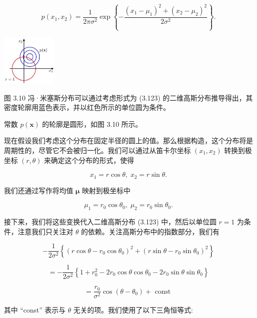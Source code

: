 \documentclass[10pt]{article}
\begin{document}
\[
p\left( {{x}_{1},{x}_{2}}\right)  = \frac{1}{{2\pi }{\sigma }^{2}}\exp \left\{  {-\frac{{\left( {x}_{1} - {\mu }_{1}\right) }^{2} + {\left( {x}_{2} - {\mu }_{2}\right) }^{2}}{2{\sigma }^{2}}}\right\}  . \tag{3.123}
\]

\begin{center}
\includegraphics[max width=0.2\textwidth]{images/0194e279-9b28-703a-88f4-c3ac21e2010d_110_1177_344_365_339_0.jpg}
\end{center}
\hspace*{3em} 

图 3.10 冯·米塞斯分布可以通过考虑形式为 (3.123) 的二维高斯分布推导得出，其密度轮廓用蓝色表示，并以红色所示的单位圆为条件。

常数 \(p\left( \mathbf{x}\right)\) 的轮廓是圆形，如图 3.10 所示。

现在假设我们考虑这个分布在固定半径的圆上的值。那么根据构造，这个分布将是周期性的，尽管它不会被归一化。我们可以通过从笛卡尔坐标 \(\left( {{x}_{1},{x}_{2}}\right)\) 转换到极坐标 \(\left( {r,\theta }\right)\) 来确定这个分布的形式，使得

\[
{x}_{1} = r\cos \theta ,\;{x}_{2} = r\sin \theta . \tag{3.124}
\]

我们还通过写作将均值 \(\mathbf{\mu }\) 映射到极坐标中

\[
{\mu }_{1} = {r}_{0}\cos {\theta }_{0},\;{\mu }_{2} = {r}_{0}\sin {\theta }_{0}. \tag{3.125}
\]

接下来，我们将这些变换代入二维高斯分布 (3.123) 中，然后以单位圆 \(r = 1\) 为条件，注意我们只关注对 \(\theta\) 的依赖。关注高斯分布中的指数部分，我们有

\[
- \frac{1}{2{\sigma }^{2}}\left\{  {{\left( r\cos \theta  - {r}_{0}\cos {\theta }_{0}\right) }^{2} + {\left( r\sin \theta  - {r}_{0}\sin {\theta }_{0}\right) }^{2}}\right\}
\]

\[
=  - \frac{1}{2{\sigma }^{2}}\left\{  {1 + {r}_{0}^{2} - 2{r}_{0}\cos \theta \cos {\theta }_{0} - 2{r}_{0}\sin \theta \sin {\theta }_{0}}\right\}
\]

\[
= \frac{{r}_{0}}{{\sigma }^{2}}\cos \left( {\theta  - {\theta }_{0}}\right)  + \text{ const } \tag{3.126}
\]

其中 “const” 表示与 \(\theta\) 无关的项。我们使用了以下三角恒等式:
\end{document}
